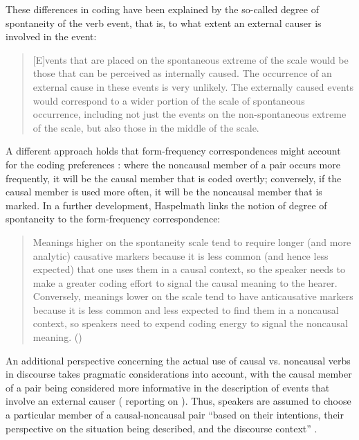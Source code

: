\documentclass[output=paper,colorlinks,citecolor=brown]{langscibook}
\begin{document}
These differences in coding have been explained by the so-called degree of spontaneity of the verb event, that is, to what extent an external causer is involved in the event:
\begin{quote}
    [E]vents that are placed on the spontaneous extreme of the scale would be those that can be perceived as internally caused. The occurrence of an external cause in these events is very unlikely. The externally caused events would correspond to a wider portion of the scale of spontaneous occurrence, including not just the events on the non-spontaneous extreme of the scale, but also those in the middle of the scale. \citep[4]{Samardžić2012}
\end{quote}

A different approach holds that form-frequency correspondences might account for the coding preferences \citep{Haspelmathetal2014}: where the noncausal member of a pair occurs more frequently, it will be the causal member that is coded overtly; conversely, if the causal member is used more often, it will be the noncausal member that is marked. In a further development, Haspelmath links the notion of degree of spontaneity to the form-frequency correspondence:
\begin{quote}
    Meanings higher on the spontaneity scale tend to require longer (and more analytic) causative markers because it is less common (and hence less expected) that one uses them in a causal context, so the speaker needs to make a greater coding effort to signal the causal meaning to the hearer. Conversely, meanings lower on the scale tend to have anticausative markers because it is less common and less expected to find them in a noncausal context, so speakers need to expend coding energy to signal the noncausal meaning. (\citeyear[57]{Haspelmath2016})
\end{quote}

An additional perspective concerning the actual use of causal vs. noncausal verbs in discourse takes pragmatic considerations into account, with the causal member of a pair being considered more informative in the description of events that involve an external causer (\citealt[77--78]{Levin2015} reporting on \citealt{Hovav2014}). Thus, speakers are assumed to choose a particular member of a causal-noncausal pair “based on their intentions, their perspective on the situation being described, and the discourse context” \citep[78]{Levin2015}.
\end{document}
